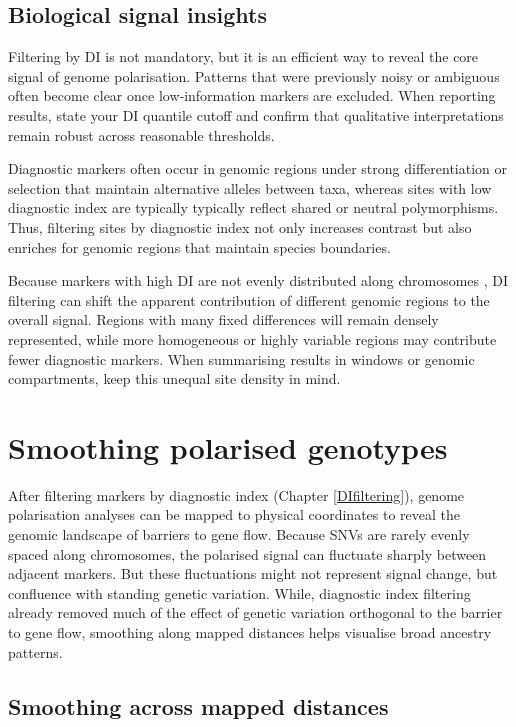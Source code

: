 \documentclass[
]{book}
\begin{document}
\section{Biological signal insights}\label{biological-signal-insights}

Filtering by DI is not mandatory, but it is an efficient way to reveal the core signal of genome polarisation. Patterns that were previously noisy or ambiguous often become clear once low‑information markers are excluded. When reporting results, state your DI quantile cutoff and confirm that qualitative interpretations remain robust across reasonable thresholds.

Diagnostic markers often occur in genomic regions under strong differentiation or selection that maintain alternative alleles between taxa, whereas sites with low diagnostic index are typically typically reflect shared or neutral polymorphisms. Thus, filtering sites by diagnostic index not only increases contrast but also enriches for genomic regions that maintain species boundaries.

Because markers with high DI are not evenly distributed along chromosomes \citep{Jagos2025}, DI filtering can shift the apparent contribution of different genomic regions to the overall signal. Regions with many fixed differences will remain densely represented, while more homogeneous or highly variable regions may contribute fewer diagnostic markers. When summarising results in windows or genomic compartments, keep this unequal site density in mind.

\chapter{Smoothing polarised genotypes}\label{smoothing-chapter}

After filtering markers by diagnostic index (Chapter \ref{DIfiltering}), genome polarisation analyses can be mapped to physical coordinates to reveal the genomic landscape of barriers to gene flow. Because SNVs are rarely evenly spaced along chromosomes, the polarised signal can fluctuate sharply between adjacent markers. But these fluctuations might not represent signal change, but confluence with standing genetic variation. While, diagnostic index filtering already removed much of the effect of genetic variation orthogonal to the barrier to gene flow, smoothing along mapped distances helps visualise broad ancestry patterns.

\section{Smoothing across mapped distances}\label{smoothing-across-mapped-distances}
\end{document}
